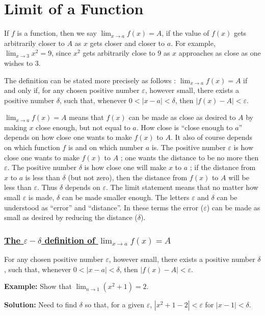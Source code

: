 \documentclass[titlepage,a4paper,12pt]{report}
\begin{document}
\section{Limit of a Function}
If $f$ is a function, then we say $\displaystyle \lim _{x\rightarrow a}f(x)=A$, if the value of $f(x)$ gets arbitrarily closer to $A$ as $x$ gets closer and closer to $a$. For example, $\displaystyle \lim _{x\rightarrow 3} x^2=9$, since $x^2$ gets arbitrarily close to $9$ as $x$ approaches as close as one wishes to $3$.

\noindent The definition can be stated more precisely as follows : $\displaystyle \lim _{x\rightarrow a}f(x)=A$ if and only if, for any chosen positive number $\varepsilon$, however small, there exists a positive number $\delta$, such that, whenever $0<|x-a|<\delta$, then $|f(x)-A|<\varepsilon$.

\noindent $\displaystyle \lim _{x\rightarrow a}f(x)=A$ means that $f(x)$ can be made as close as desired to $A$ by making $x$ close enough, but not equal to $a$. How close is ``close enough to $a$'' depends on how close one wants to make $f(x)$ to $A$.  It also of course depends on which function $f$ is and on which number $a$ is. The positive number $\varepsilon$ is how close one wants to make $f(x)$ to $A$ ; one wants the distance to be no more then $\varepsilon$. The positive number $\delta$ is how close one will make $x$ to $a$ ; if the distance from $x$ to $a$ is less than $\delta$ (but not zero), then the distance from $f(x)$ to $A$ will be less than $\varepsilon$. Thus $\delta$ depends on $\varepsilon$. The limit statement means that no matter how small $\varepsilon$ is made, $\delta$ can be made smaller enough. The letters $\varepsilon$ and $\delta$ can be understood as ``error'' and ``distance''. In these terms the error ($\varepsilon$) can be made as small as desired by reducing the distance ($\delta$).

\subsubsection{\underline{The $\varepsilon - \delta$ definition of $\displaystyle \lim _{x\rightarrow a}f(x)=A$}}
For any chosen positive number $\varepsilon$, however small, there exists a positive number $\delta$, such that, whenever $0<|x-a|<\delta$, then $|f(x)-A|<\varepsilon$.

\noindent \textbf{Example:} Show that $\displaystyle \lim _{n\rightarrow 1}(x^2+1)=2$.

\noindent \textbf{Solution:} Need to find $\delta$ so that, for a given $\varepsilon$, $|x^2+1-2|<\varepsilon$ for $|x-1|<\delta$.
\end{document}
